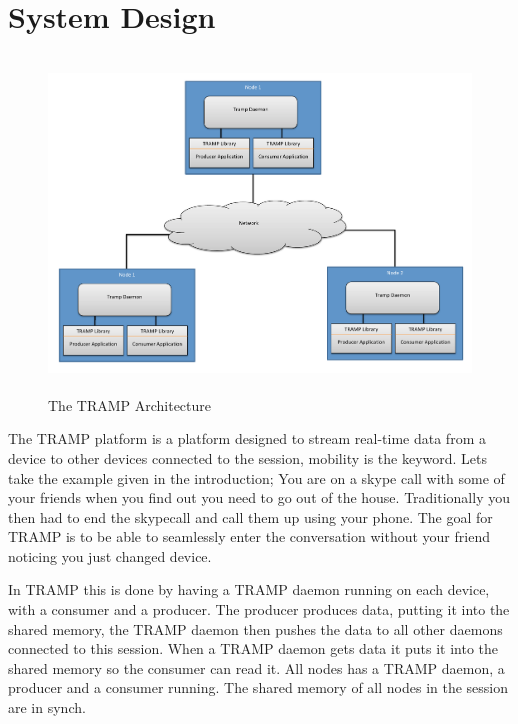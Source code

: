 \section{System Design}
\label{sec:design}

\begin{center}
\begin{figure}[h]
 \includegraphics[width=7.0in, height=3.5in]{img1.pdf}
\caption{The TRAMP Architecture}
\end{figure}
\end{center}

The TRAMP platform is a platform designed to stream real-time data from a device to other devices connected to the session, mobility is the keyword. Lets take the example given in the introduction; You are on a skype call with some of your friends when you find out you need to go out of the house. Traditionally you then had to end the skypecall and call them up using your phone. The goal for TRAMP is to be able to seamlessly enter the conversation without your friend noticing you just changed device.

In TRAMP this is done by having a TRAMP daemon running on each device, with a consumer and a producer. The producer produces data, putting it into the shared memory, the TRAMP daemon then pushes the data to all other daemons connected to this session. When a TRAMP daemon gets data it puts it into the shared memory so the consumer can read it. All nodes has a TRAMP daemon, a producer and a consumer running. The shared memory of all nodes in the session are in synch.

